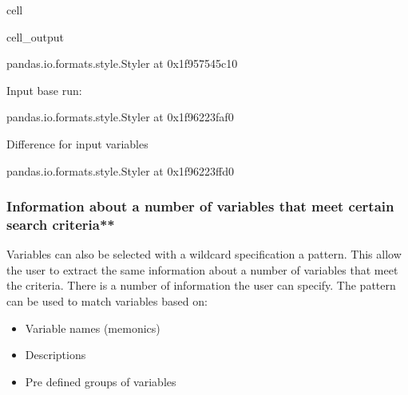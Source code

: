 \documentclass[letterpaper,10pt,english]{jupyterBook}
\begin{document}
\begin{sphinxuseclass}{cell}
\begin{sphinxVerbatimOutput}
\begin{sphinxuseclass}{cell_output}
\begin{sphinxVerbatim}[commandchars=\\\{\}]
\PYGZlt{}pandas.io.formats.style.Styler at 0x1f957545c10\PYGZgt{}
\end{sphinxVerbatim}

\begin{sphinxVerbatim}[commandchars=\\\{\}]
Input base run:
\end{sphinxVerbatim}

\begin{sphinxVerbatim}[commandchars=\\\{\}]
\PYGZlt{}pandas.io.formats.style.Styler at 0x1f96223faf0\PYGZgt{}
\end{sphinxVerbatim}

\begin{sphinxVerbatim}[commandchars=\\\{\}]
Difference for input variables
\end{sphinxVerbatim}

\begin{sphinxVerbatim}[commandchars=\\\{\}]
\PYGZlt{}pandas.io.formats.style.Styler at 0x1f96223ffd0\PYGZgt{}
\end{sphinxVerbatim}

\begin{sphinxVerbatim}[commandchars=\\\{\}]

\end{sphinxVerbatim}

\end{sphinxuseclass}\end{sphinxVerbatimOutput}

\end{sphinxuseclass}

\subsubsection{Information about a number of variables that meet certain search criteria**}
\label{\detokenize{content/06_WBModels/LoadingWBModel:information-about-a-number-of-variables-that-meet-certain-search-criteria}}
\sphinxAtStartPar
Variables can also be selected with a wildcard specification \sphinxhyphen{} a pattern. This allow the user to extract the same information about a number of variables that meet the criteria. There is a number of information the user can specify. The pattern can be used to match variables based on:
\begin{itemize}
\item {} 
\sphinxAtStartPar
Variable names (memonics)

\item {} 
\sphinxAtStartPar
Descriptions

\item {} 
\sphinxAtStartPar
Pre defined groups of variables

\end{itemize}
\end{document}
